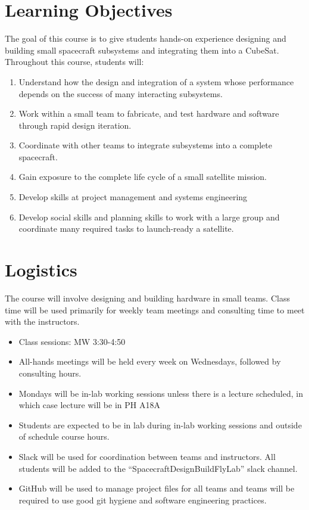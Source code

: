 \documentclass[11pt,letterpaper]{article}
\begin{document}
\section*{Learning Objectives}

The goal of this course is to give students hands-on experience designing and
building small spacecraft subsystems and integrating them into a CubeSat.
Throughout this course, students will:
\begin{enumerate}
	\item Understand how the design and integration of a system whose performance depends on the success of many interacting subsystems.
	\item Work within a small team to fabricate, and test hardware and software through rapid design iteration.
	\item Coordinate with other teams to integrate subsystems into a complete spacecraft.
	\item Gain exposure to the complete life cycle of a small satellite mission.
	\item Develop skills at project management and systems engineering
	\item Develop social skills and planning skills to work with a large group and coordinate many required tasks to launch-ready a satellite.
\end{enumerate}


\section*{Logistics}

The course will involve designing and building hardware in small teams. Class time will be used primarily for weekly team meetings and consulting time to meet with the instructors.

\begin{itemize}
	\item Class sessions: MW 3:30-4:50
	\item All-hands meetings will be held every week on Wednesdays, followed by consulting hours.
	\item Mondays will be in-lab working sessions unless there is a lecture scheduled, in which case lecture will be in PH A18A
	\item Students are expected to be in lab during in-lab working sessions and outside of schedule course hours.
	\item Slack will be used for coordination between teams and instructors. All students will be added to the ``SpacecraftDesignBuildFlyLab'' slack channel.
	\item GitHub will be used to manage project files for all teams and teams will be required to use good git hygiene and software engineering practices.
\end{itemize}
\end{document}
